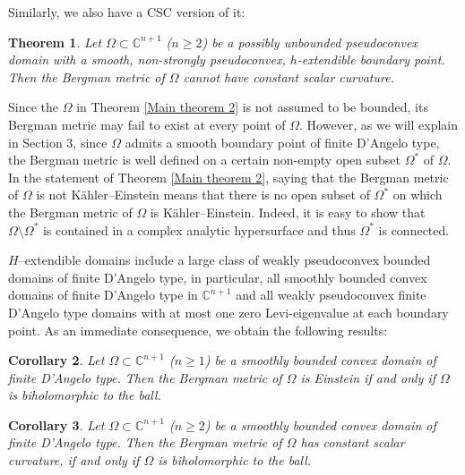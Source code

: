 \documentclass[a4paper,centertags,oneside,12pt]{amsart}
\newcommand{\CC}{\mathbb C}
\newcommand{\sm}{\setminus}
\newtheorem{theorem}{Theorem}[section]
\newtheorem{corollary}[theorem]{Corollary}
\numberwithin{equation}{section}
\begin{document}
Similarly, we also have a CSC version of it:

\renewcommand{\thetheorem}{1.4'}
\begin{theorem}\label{Main theorem 2-CSC}
    Let \(\Omega \subset \mathbb{C}^{n+1}\) (\(n \geq 2\)) be a possibly unbounded pseudoconvex domain with a smooth, non-strongly pseudoconvex, \(h\)-extendible boundary point. Then the Bergman metric of \(\Omega\) cannot  have constant scalar curvature.
\end{theorem}
\renewcommand{\thetheorem}{\arabic{section}.\arabic{theorem}} 











Since the $\Omega$ in Theorem \ref{Main theorem 2} is not assumed to be bounded, its Bergman metric may fail to exist at every  point of $\Omega$.  However, as we will explain in Section 3, since  $\Omega$ admits a smooth boundary point of finite D’Angelo type,  the Bergman metric is well defined on a certain non-empty open subset $\Omega^*$ of $\Omega$.
In the statement of Theorem \ref{Main theorem 2}, saying that the Bergman metric of  $\Omega$ is not Kähler--Einstein means that there is no open subset of  $\Omega^*$ on which the Bergman metric of $\Omega$ is Kähler--Einstein. Indeed, it is easy to show that $\Omega\sm \Omega^*$ is contained in a complex analytic hypersurface and thus $\Omega^*$ is connected. 


$H$--extendible domains include a large class of weakly pseudoconvex bounded domains of finite D’Angelo type, in particular, all smoothly bounded convex domains of finite D'Angelo  type in $\CC^{n+1}$ and all weakly pseudoconvex finite D'Angelo type domains with at most one zero Levi-eigenvalue at each boundary point. As an immediate consequence, we obtain the following results:

\begin{corollary}\label{Main theorem 2-convex}
Let \(\Omega \subset \mathbb{C}^{n+1}\) (\(n \geq 1\)) be a smoothly bounded convex domain of finite D'Angelo type. Then the Bergman metric of \(\Omega\) is Einstein  if and only if \(\Omega\) is biholomorphic to the ball.
\end{corollary}


\renewcommand{\thetheorem}{1.6'}
\begin{corollary}\label{Main theorem 2-convex-CSC}
    Let \(\Omega \subset \mathbb{C}^{n+1}\) (\(n \geq 2\)) be a smoothly bounded convex domain of finite D'Angelo type. Then the Bergman metric of \(\Omega\)  has constant scalar curvature, if and only if \(\Omega\) is biholomorphic to the ball.
\end{corollary}
\renewcommand{\thetheorem}{\arabic{section}.\arabic{theorem}}
\end{document}
